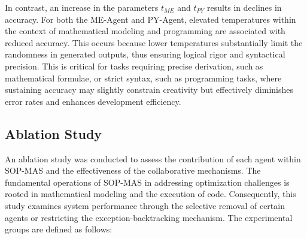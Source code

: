 \documentclass[preprint,12pt]{elsarticle}
\begin{document}
In contrast, an increase in the parameters $t_{ME}$ and $t_{PY}$ results in declines in accuracy. For both the ME-Agent and PY-Agent, elevated temperatures within the context of mathematical modeling and programming are associated with reduced accuracy. This occurs because lower temperatures substantially limit the randomness in generated outputs, thus ensuring logical rigor and syntactical precision. This is critical for tasks requiring precise derivation, such as mathematical formulae, or strict syntax, such as programming tasks, where sustaining accuracy may slightly constrain creativity but effectively diminishes error rates and enhances development efficiency.

\subsection{Ablation Study}
An ablation study was conducted to assess the contribution of each agent within SOP-MAS and the effectiveness of the collaborative mechanisms. The fundamental operations of SOP-MAS in addressing optimization challenges is rooted in mathematical modeling and the execution of code. Consequently, this study examines system performance through the selective removal of certain agents or restricting the exception-backtracking mechanism. The experimental groups are defined as follows:
\end{document}
